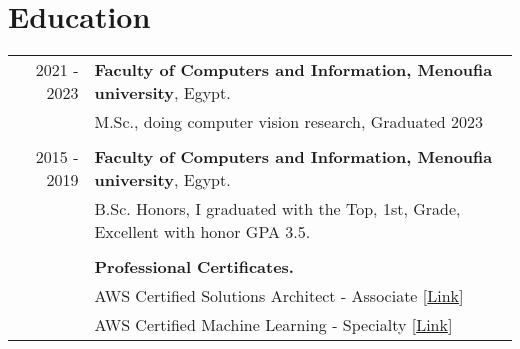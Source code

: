 \documentclass[a4paper,10pt]{article}
\begin{document}
\section{\textbf{Education}}
\begin{tabular}{r|l}
    2021 - 2023  & \textbf{Faculty of Computers and Information, Menoufia university}, Egypt.\\ & M.Sc., doing computer vision research, Graduated  2023 \\
    &\\
    2015 - 2019 & \textbf{Faculty of Computers and Information, Menoufia university}, Egypt. \\ & B.Sc. Honors, I graduated with the Top, 1st, Grade, Excellent with honor GPA 3.5. \\
    &\\
    & \textbf{Professional Certificates.} \\
    & AWS Certified Solutions Architect - Associate [\href{https://cp.certmetrics.com/amazon/en/public/verify/credential/8ff7ef944a1c49cf873b541903d9cbc3}{Link}] \\
    & AWS Certified Machine Learning - Specialty [\href{https://cp.certmetrics.com/amazon/en/public/verify/credential/b5b06f594c0a45929e1971bf5215daf7}{Link}] \\
    \end{tabular}


\end{document}

